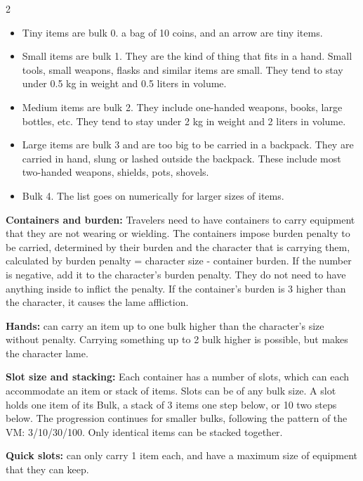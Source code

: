 \begin{multicols}{2}
\begin{itemize}
    \item Tiny items are bulk 0. a bag of 10 coins, and an arrow are tiny items.
    \item Small items are bulk 1. They are the kind of thing that fits in a hand. Small tools, small weapons, flasks and similar items are small. They tend to stay under 0.5 kg in weight and 0.5 liters in volume. 
    \item Medium items are bulk 2. They include one-handed weapons, books, large bottles, etc. They tend to stay under 2 kg in weight and 2 liters in volume.
    \item Large items are bulk 3 and are too big to be carried in a backpack. They are carried in hand, slung or lashed outside the backpack. These include most two-handed weapons, shields, pots, shovels. 
    \item Bulk 4. The list goes on numerically for larger sizes of items.
\end{itemize}

\textbf{Containers and burden:} Travelers need to have containers to carry equipment that they are not wearing or wielding. The containers impose burden penalty to be carried, determined by their burden and the character that is carrying them, calculated by burden penalty = character size - container burden. If the number is negative, add it to the character's burden penalty. They do not need to have anything inside to inflict the penalty. If the container's burden is 3 higher than the character, it causes the lame affliction.

\textbf{Hands:} can carry an item up to one bulk higher than the character's size without penalty. Carrying something up to 2 bulk higher is possible, but makes the character lame.

\textbf{Slot size and stacking:} Each container has a number of slots, which can each accommodate an item or stack of items. Slots can be of any bulk size. A slot holds one item of its Bulk, a stack of 3 items one step below, or 10 two steps below. The progression continues for smaller bulks, following the pattern of the VM: 3/10/30/100. Only identical items can be stacked together.

\textbf{Quick slots:} can only carry 1 item each, and have a maximum size of equipment that they can keep.


\end{multicols}
